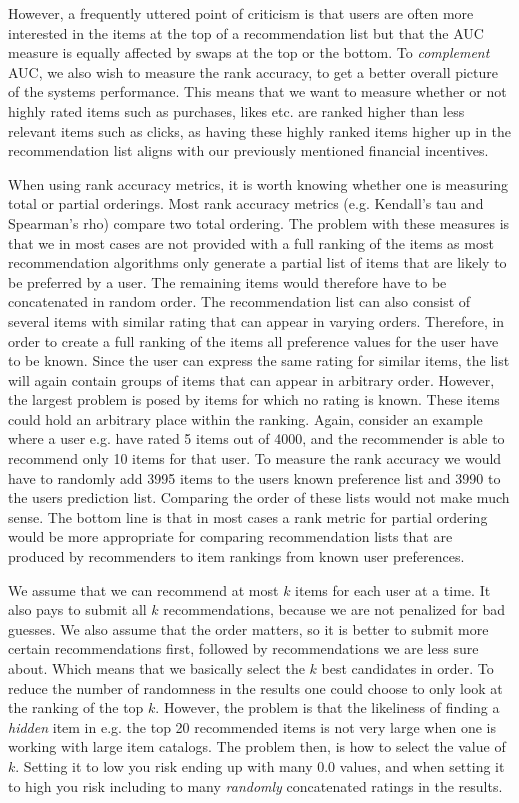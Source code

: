 However, a frequently uttered point of criticism is that users are often more interested in the items
at the top of a recommendation list but that the AUC measure is equally affected by swaps at the top
or the bottom. To \emph{complement} AUC, we also wish to measure the rank accuracy, to get a better
overall picture of the systems performance. This means that we want to measure whether or not
highly rated items such as purchases, likes etc. are ranked higher than less relevant items such as clicks,
as having these highly ranked items higher up in the recommendation list aligns with our previously
mentioned financial incentives.


When using rank accuracy metrics, it is worth knowing whether one is measuring total or partial orderings.
Most rank accuracy metrics (e.g. Kendall's tau and Spearman's rho) compare two total ordering. The problem
with these measures is that we in most cases are not provided with a full ranking of the items as most recommendation
algorithms only generate a partial list of items that are likely to be preferred by a user. The remaining items
would therefore have to be concatenated in random order. The recommendation list can also consist of several
items with similar rating that can appear in varying orders. Therefore, in order to create a full ranking of
the items all preference values for the user have to be known. Since the user can express the same rating for similar
items, the list will again contain groups of items that can appear in arbitrary order. However, the largest problem
is posed by items for which no rating is known. These items could hold an arbitrary place within the ranking.
Again, consider an example where a user e.g. have rated 5 items out of 4000, and the recommender is able to recommend
only 10 items for that user. To measure the rank accuracy we would have to randomly add 3995 items to the users known
preference list and 3990 to the users prediction list. Comparing the order of these lists would not make much sense. The bottom line is that in most cases a rank metric for partial ordering would be more appropriate for comparing recommendation lists that are produced by recommenders to item rankings from known user preferences.

We assume that we can recommend at most $k$ items for each user at a time. It also pays to submit all $k$
recommendations, because we are not penalized for bad guesses. We also assume that the order matters, so it
is better to submit more certain recommendations first, followed by recommendations we are less sure about.
Which means that we basically select the $k$ best candidates in order. To reduce the number of randomness in
the results one could choose to only look at the ranking of the top $k$. However, the problem is that the
likeliness of finding a \emph{hidden} item in e.g. the top 20 recommended items is not very large when one is working
with large item catalogs. The problem then, is how to select the value of $k$. Setting it to low you risk
ending up with many $0.0$ values, and when setting it to high you risk including to many \emph{randomly} concatenated 
ratings in the results.

